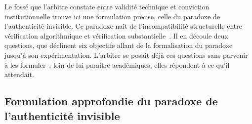 \begin{boiteArbitre}
Le foss\'e que l'arbitre constate entre validit\'e technique et conviction
institutionnelle trouve ici une formulation pr\'ecise, celle du paradoxe de
l'authenticit\'e invisible. Ce paradoxe na\^it de l'incompatibilit\'e structurelle entre
v\'erification algorithmique et v\'erification substantielle~\cite{MINKA2026CLO,eIDAS14}.
Il en d\'ecoule deux questions, que d\'eclinent six objectifs allant de la formalisation du
paradoxe jusqu'\`a son exp\'erimentation. L'arbitre se posait d\'ej\`a ces questions sans parvenir
\`a les formuler~; loin de lui para\^itre acad\'emiques, elles r\'epondent \`a ce
qu'il attendait.
\end{boiteArbitre}

\subsection{Formulation approfondie du paradoxe de l'authenticit\'e invisible}
\label{subsec:paradoxe_authenticite}
